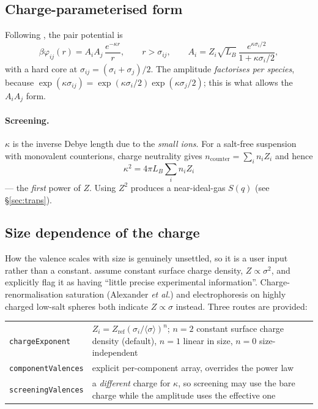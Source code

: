 \documentclass[11pt,a4paper]{article}
\newcommand{\code}[1]{\texttt{#1}}
\begin{document}
\subsection{Charge-parameterised form}

Following \cite{daguanno1992}, the pair potential is
\begin{equation}
\beta\varphi_{ij}(r) = A_iA_j\,\frac{e^{-\kappa r}}{r},\qquad r>\sigma_{ij},
\qquad
A_i = Z_i\sqrt{L_B}\,\frac{e^{\kappa\sigma_i/2}}{1+\kappa\sigma_i/2},
\label{eq:dkpot}
\end{equation}
with a hard core at $\sigma_{ij}=(\sigma_i+\sigma_j)/2$. The amplitude
\emph{factorises per species}, because
$\exp(\kappa\sigma_{ij}) = \exp(\kappa\sigma_i/2)\exp(\kappa\sigma_j/2)$;
this is what allows the $A_iA_j$ form.

\paragraph{Screening.} $\kappa$ is the inverse Debye length due to the
\emph{small ions}. For a salt-free suspension with monovalent counterions,
charge neutrality gives $n_{\text{counter}}=\sum_i n_iZ_i$ and hence
\begin{equation}
\kappa^2 = 4\pi L_B\sum_i n_i Z_i
\label{eq:kappa}
\end{equation}
--- the \emph{first} power of $Z$. Using $Z^2$ produces a near-ideal-gas
$S(q)$ (see \S\ref{sec:traps}).

\subsection{Size dependence of the charge}
\label{sec:charge}

How the valence scales with size is genuinely unsettled, so it is a user
input rather than a constant. \cite{daguanno1991} assume constant surface
charge density, $Z\propto\sigma^2$, and explicitly flag it as having ``little
precise experimental information''. Charge-renormalisation saturation
(Alexander \emph{et al.}) and electrophoresis on highly charged low-salt
spheres both indicate $Z\propto\sigma$ instead. Three routes are provided:

\begin{center}
\begin{tabular}{@{}p{}p{}@{}}
\toprule
\code{chargeExponent} & $Z_i = Z_{\text{ref}}(\sigma_i/\langle\sigma\rangle)^n$;
  $n=2$ constant surface charge density (default), $n=1$ linear in size,
  $n=0$ size-independent \\
\code{componentValences} & explicit per-component array, overrides the power law \\
\code{screeningValences} & a \emph{different} charge for $\kappa$, so screening
  may use the bare charge while the amplitude uses the effective one \\
\bottomrule
\end{tabular}
\end{center}
\end{document}

